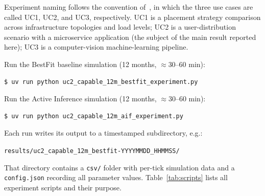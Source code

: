 \documentclass[11pt, a4paper]{article}
\begin{document}
\begin{appendices}
Experiment naming follows the convention of~\cite{eclypse}, in which the three
use cases are called UC1, UC2, and UC3, respectively.
UC1 is a placement strategy comparison across infrastructure topologies and load
levels; UC2 is a user-distribution scenario with a microservice application
(the subject of the main result reported here); UC3 is a computer-vision
machine-learning pipeline.

Run the BestFit baseline simulation (12 months, $\approx$30--60 min):

\begin{lstlisting}[language=bash]
$ uv run python uc2_capable_12m_bestfit_experiment.py
\end{lstlisting}

Run the Active Inference simulation (12 months, $\approx$30--60 min):

\begin{lstlisting}[language=bash]
$ uv run python uc2_capable_12m_aif_experiment.py
\end{lstlisting}

Each run writes its output to a timestamped subdirectory, e.g.:
\begin{center}
  \texttt{results/uc2\_capable\_12m\_bestfit-YYYYMMDD\_HHMMSS/}
\end{center}
That directory contains a \texttt{csv/} folder with per-tick simulation data
and a \texttt{config.json} recording all parameter values.
Table~\ref{tab:scripts} lists all experiment scripts and their purpose.


\end{appendices}
\end{document}

